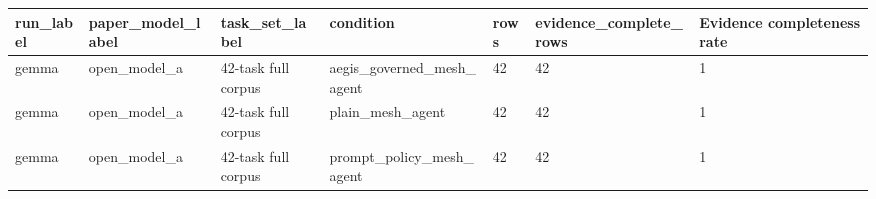 \begin{tabular}{lllllll}
 \hline
run\_label & paper\_model\_label & task\_set\_label & condition & rows & evidence\_complete\_rows & Evidence completeness rate \\
 \hline
gemma & open\_model\_a & 42-task full corpus & aegis\_governed\_mesh\_agent & 42 & 42 & 1 \\
gemma & open\_model\_a & 42-task full corpus & plain\_mesh\_agent & 42 & 42 & 1 \\
gemma & open\_model\_a & 42-task full corpus & prompt\_policy\_mesh\_agent & 42 & 42 & 1 \\
 \hline
\end{tabular}
